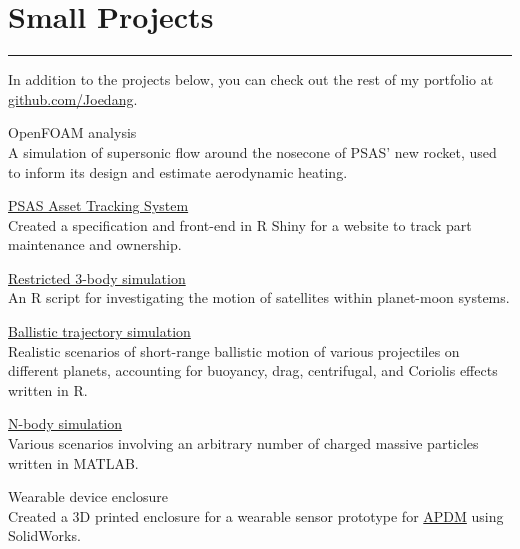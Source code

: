 \section{Small Projects}
\noindent\rule{\textwidth}{\hlinewidth}
In addition to the projects below, you can check out the rest of my portfolio at \href{https://github.com/Joedang}{github.com/Joedang}.
	\begin{innerlist}
	\item OpenFOAM analysis\\
	A simulation of supersonic flow around the nosecone of PSAS' new rocket, used to inform its design and estimate aerodynamic heating.
	\item \href{https://github.com/joedang/pats}{PSAS Asset Tracking System} \\
	Created a specification and front-end in R Shiny for a website to track part maintenance and ownership.
	\item \href{https://github.com/Joedang/restricted\_three\_body\_problem}{Restricted 3-body simulation} \\
	An R script for investigating the motion of satellites within planet-moon systems. 
	\item \href{https://github.com/Joedang/Portfolio/tree/master/projectile}{Ballistic trajectory simulation} \\
	Realistic scenarios of short-range ballistic motion of various projectiles on different planets, accounting for buoyancy, drag, centrifugal, and Coriolis effects written in R.
	\item \href{https://github.com/Joedang/Portfolio/tree/master/MATLAB\_orbits}{N-body simulation} \\
	Various scenarios involving an arbitrary number of charged massive particles written in MATLAB.
	\item Wearable device enclosure \\
	Created a 3D printed enclosure for a wearable sensor prototype for \href{https://www.apdm.com/}{APDM} using SolidWorks.
	\end{innerlist}
\vfill
